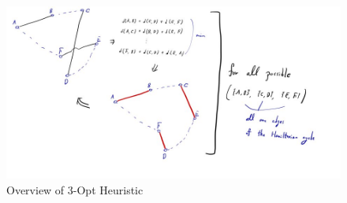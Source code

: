 \documentclass[a4paper]{article}
\begin{document}
\begin{figure}
\centering
\includegraphics[width=\textwidth]{Figures/fig4.jpg}
\caption{Overview of 3-Opt Heuristic}
\label{fig4}
\end{figure}
\end{document}
